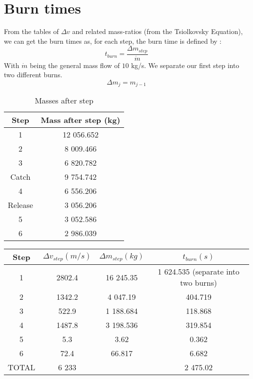 \section{Burn times}
\qquad From the tables of $\Delta v$ and related mass-ratios (from the Tsiolkovsky Equation), we can get the burn times as, for each step, the burn time is defined by : 
\begin{equation}
	t_{burn} = \frac{\Delta m_{step}}{\dot{m}}
\end{equation}
With $\dot{m}$ being the general mass flow of $10$ kg/s. We separate our first step into two different burns. 
\begin{equation}
	\Delta m_j  = m_{j-1}
\end{equation}
\begin{table}
	\centering
	\begin{tabular}{|c|c|}
		\hline
		Step & Mass after step (kg)\\
		\hline
		1 & 12 056.652\\
		\hline
		2 & 8 009.466\\
		\hline
		3 & 6 820.782\\
		\hline
		Catch & 9 754.742\\
		\hline
		4 & 6 556.206\\
		\hline
		Release & 3 056.206\\
		\hline
		5 & 3 052.586\\
		\hline
		6 & 2 986.039\\
		\hline
	\end{tabular}
	\caption{Masses after step} \label{tabmass}
\end{table}
\begin{table}[H]
	\centering
	\begin{tabular}{|c|c|c|c|}
		\hline
		Step & $\Delta v_{step}(m/s)$ &  $\Delta m_{step} (kg)$ & $t_{burn} (s)$\\
		\hline
		1 & 2802.4 &  16 245.35 & 1 624.535 (separate into two burns)\\
		\hline
		2 & 1342.2 & 4 047.19 & 404.719\\
		\hline
		3 & 522.9 & 1 188.684 & 118.868\\
		\hline
		4 & 1487.8 & 3 198.536 & 319.854\\
		\hline
		5 & 5.3 & 3.62 & 0.362\\
		\hline
		6 & 72.4 & 66.817 & 6.682\\
		\hline
		TOTAL & 6 233 &  & 2 475.02\\
		\hline
	\end{tabular}
\end{table}